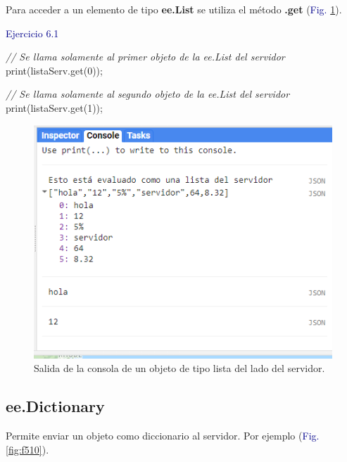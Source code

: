 \documentclass[
  12pt,
  letterpaper,
  twoside]{book}
\newenvironment{Shaded}{\begin{snugshade}}{\end{snugshade}}
\newcommand{\CommentTok}[1]{\textcolor[rgb]{0.24,0.58,0.00}{\textit{#1}}}
\newcommand{\DecValTok}[1]{\textcolor[rgb]{0.28,0.53,0.93}{#1}}
\newcommand{\FunctionTok}[1]{\textcolor[rgb]{0.48,0.12,0.64}{#1}}
\newcommand{\NormalTok}[1]{#1}
\newcommand{\OperatorTok}[1]{\textcolor[rgb]{0.00,0.00,0.00}{#1}}
\newcommand\boldpurple[1]{\textcolor{darkpurple}{\textbf{#1}}}
\begin{document}
Para acceder a un elemento de tipo \boldpurple{ee.List} se utiliza el método \boldpurple{.get} (\textcolor{darkblue}{Fig.} \ref{fig:f59}).

\textcolor{darkblue}{Ejercicio 6.1}

\begin{Shaded}
\begin{Highlighting}[]
\CommentTok{// Se llama solamente al primer objeto de la ee.List del servidor}
\FunctionTok{print}\NormalTok{(listaServ}\OperatorTok{.}\FunctionTok{get}\NormalTok{(}\DecValTok{0}\NormalTok{))}\OperatorTok{;}   

\CommentTok{// Se llama solamente al segundo objeto de la ee.List del servidor}
\FunctionTok{print}\NormalTok{(listaServ}\OperatorTok{.}\FunctionTok{get}\NormalTok{(}\DecValTok{1}\NormalTok{))}\OperatorTok{;} 
\end{Highlighting}
\end{Shaded}

\begin{figure}[H]

{\centering \includegraphics[width=0.7\linewidth]{Img/ej6} 

}

\caption{Salida de la consola de un objeto de tipo lista del lado del servidor.}\label{fig:f59}
\end{figure}

\hypertarget{ee.dictionary}{%
\subsection*{ee.Dictionary}\label{ee.dictionary}}

Permite enviar un objeto como diccionario al servidor. Por ejemplo (\textcolor{darkblue}{Fig.} \ref{fig:f510}).
\end{document}
